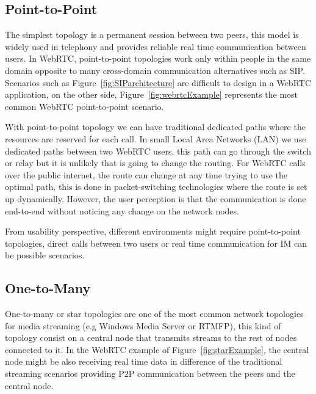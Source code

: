 \subsection{Point-to-Point}

The simplest topology is a permanent session between two peers, this model is widely used in telephony and provides reliable real time communication between users. In WebRTC, point-to-point topologies work only within people in the same domain opposite to many cross-domain communication alternatives such as SIP. Scenarios such as Figure~\ref{fig:SIParchitecture} are difficult to design in a WebRTC application, on the other side, Figure~\ref{fig:webrtcExample} represents the most common WebRTC point-to-point scenario.

With point-to-point topology we can have traditional dedicated paths where the resources are reserved for each call. In small Local Area Networks (LAN)  we use dedicated paths between two WebRTC users, this path can go through the switch or relay but it is unlikely that is going to change the routing. For WebRTC calls over the public internet, the route can change at any time trying to use the optimal path, this is done in packet-switching technologies where the route is set up dynamically. However, the user perception is that the communication is done end-to-end without noticing any change on the network nodes. 

From usability perspective, different environments might require point-to-point topologies, direct calls between two users or real time communication for IM can be possible scenarios. 

 
\subsection{One-to-Many}

One-to-many or star topologies are one of the most common network topologies for media streaming (e.g Windows Media Server or RTMFP), this kind of topology consist on a central node that transmits streams to the rest of nodes connected to it. In the WebRTC example of Figure~\ref{fig:starExample}, the central node might be also receiving real time data in difference of the traditional streaming scenarios providing P2P communication between the peers and the central node.

